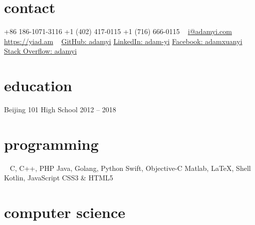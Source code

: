 \documentclass[hidelinks__VERSION__]{adamyi-cv} %
\begin{document}



\begin{aside} %
\section{contact}
+86 186-1071-3116
+1 (402) 417-0115
+1 (716) 666-0115
~
\href{mailto:i@adamyi.com}{i@adamyi.com}
\href{https://yiad.am}{https://yiad.am}
~
\href{https://github.com/adamyi}{GitHub: adamyi}
\href{https://www.linkedin.com/in/adam-yi/}{LinkedIn: adam-yi}
\href{https://www.facebook.com/adamxuanyi}{Facebook: adamxuanyi}
\href{https://stackoverflow.com/users/6482303/adamyi}{Stack Overflow: adamyi}
\section{education}
Beijing 101 High School
2012 -- 2018
\section{programming}
~
C, C++, PHP
Java, Golang, Python
Swift, Objective-C
Matlab, \LaTeX, Shell
Kotlin, JavaScript
CSS3 \& HTML5
\versionsection
\end{aside}


\section{computer science}
\end{document}
